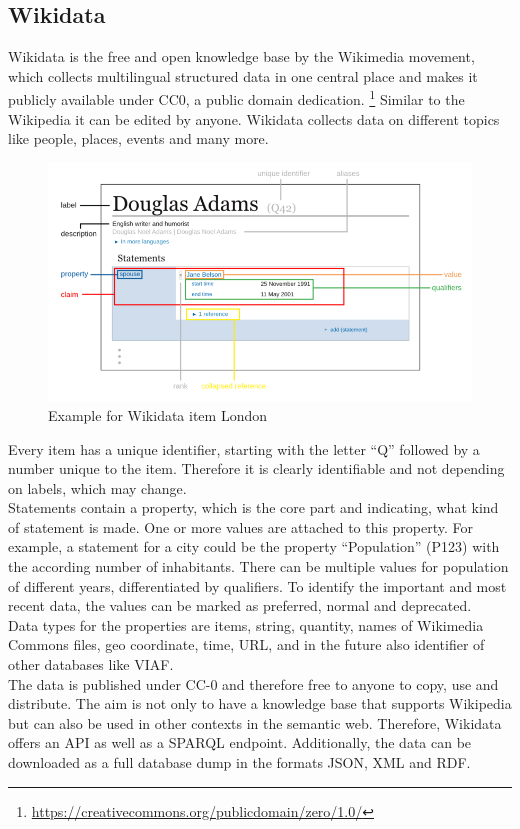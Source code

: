 \subsection{Wikidata}

Wikidata is the free and open knowledge base by the Wikimedia movement, which collects multilingual structured data in one central place and makes it publicly available under CC0, a public domain dedication. \footnote{\href{https://creativecommons.org/publicdomain/zero/1.0/}{https://creativecommons.org/publicdomain/zero/1.0/}} Similar to the Wikipedia it can be edited by anyone. Wikidata collects data on different topics like people, places, events and many more.
\begin{figure}[ht]
	\centering
	\includegraphics[width=150mm]{diagrams/Wikidata_statement.png}
	\caption{Example for Wikidata item London}
	\label{fig1}
\end{figure}
Every item has a unique identifier, starting with the letter ``Q'' followed by a number unique to the item. Therefore it is clearly identifiable and not depending on labels, which may change. \\
Statements contain a property, which is the core part and indicating, what kind of statement is made. One or more values are attached to this property. For example, a statement for a city could be the property ``Population'' (P123)  with the according number of inhabitants. There can be multiple values for population of different years, differentiated by qualifiers. To identify the important and most recent data, the values can be marked as preferred, normal and deprecated.\\
Data types for the properties  are items, string, quantity, names of Wikimedia Commons files, geo coordinate, time, URL,  and in the future also identifier of other databases like VIAF. \\
The data is published under CC-0 and therefore free to anyone to copy, use and distribute.
The aim is not only to have a knowledge base that supports Wikipedia but can also be used in other contexts in the semantic web. Therefore, Wikidata offers an API as well as a SPARQL endpoint. Additionally, the data can be downloaded as a full database dump in the formats JSON, XML and RDF.  
